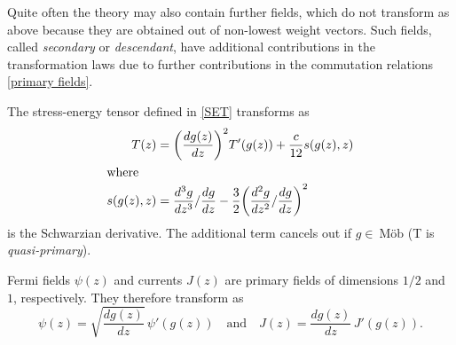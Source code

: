 Quite often
the theory may also contain further fields, which do not transform
as above because they are obtained out of non-lowest weight vectors.
Such fields, called \emph{secondary} or \emph{descendant}, have 
additional contributions in the transformation laws due to further 
contributions in the commutation relations \eqref{primary fields}.
\begin{example}
The stress-energy tensor defined in \eqref{SET} transforms as
\begin{align*}
T(z)&={\left(\frac{dg(z)}{dz}\right)}^2 T'(g(z)) +
\frac{c}{12} s(g(z),z)\\
\intertext{where}
s(g(z),z)&=\dfrac{d^3 g}{d z^3}/\dfrac{dg}{dz} -\dfrac{3}{2}
{\left(\dfrac{d^2g}{dz^2}/\dfrac{dg}{dz}\right)}^2
\end{align*}
is the Schwarzian derivative. The additional term cancels out if 
$g\in~\textrm{M\"ob}$ (T is \emph{quasi-primary}).
\end{example}
\begin{example}
Fermi fields $\psi(z)$ and currents $J(z)$ are primary fields of
dimensions $1/2$ and $1$, respectively. They therefore transform as
\[
\psi(z)=\sqrt{\frac{dg(z)}{dz}}\,\psi'(g(z))\quad\text{and}\quad
J(z)=\frac{dg(z)}{dz}\,J'(g(z)).
\]
\end{example}


